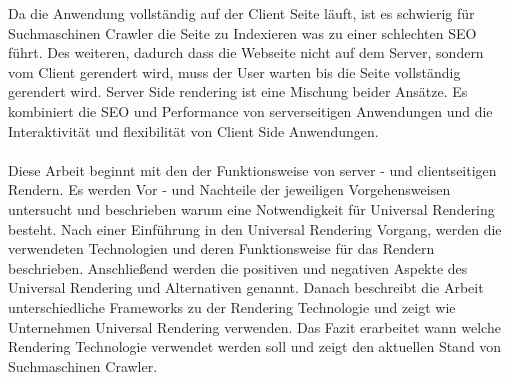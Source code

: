 \documentclass[runningheads]{llncs}
\numberwithin{figure}{section}
\begin{document}
Da die Anwendung vollständig auf der Client Seite läuft, ist es schwierig für Suchmaschinen Crawler die Seite zu Indexieren was zu einer schlechten SEO führt.
Des weiteren, dadurch dass die Webseite nicht auf dem Server, sondern vom Client gerendert wird, muss der User warten bis die Seite vollständig gerendert wird.
Server Side rendering ist eine Mischung beider Ansätze. Es kombiniert die SEO und Performance von serverseitigen Anwendungen und die Interaktivität und flexibilität von Client Side Anwendungen.
\\
\\
Diese Arbeit beginnt mit den der Funktionsweise von server - und clientseitigen Rendern. 
Es werden Vor - und Nachteile der jeweiligen Vorgehensweisen untersucht 
und beschrieben warum eine Notwendigkeit für Universal Rendering besteht. 
Nach einer Einführung in den Universal Rendering Vorgang, werden die verwendeten Technologien und deren Funktionsweise für das Rendern beschrieben. 
Anschließend werden die positiven und negativen Aspekte des Universal Rendering und Alternativen genannt. 
Danach beschreibt die Arbeit unterschiedliche Frameworks zu der Rendering Technologie und zeigt wie Unternehmen Universal Rendering verwenden. 
Das Fazit erarbeitet wann welche Rendering Technologie verwendet werden soll und zeigt den aktuellen Stand von Suchmaschinen Crawler.
\newpage
\end{document}

